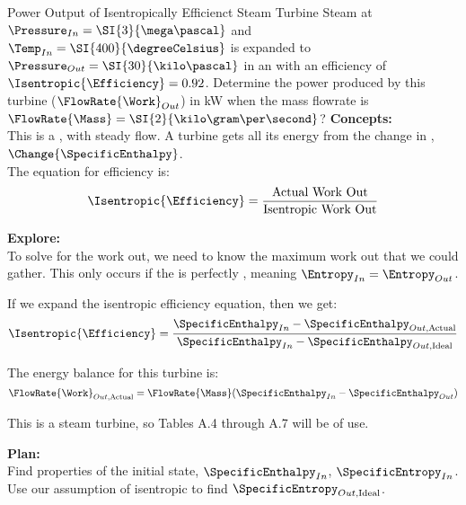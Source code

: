 \begin{example}{Power Output of Isentropically Efficienct Steam Turbine}
  Steam at $\Pressure_{In} = \SI{3}{\mega\pascal}$ and $\Temp_{In} = \SI{400}{\degreeCelsius}$ is expanded to $\Pressure_{Out} = \SI{30}{\kilo\pascal}$ in an   with an  efficiency of $\Isentropic{\Efficiency} = 0.92$.
  Determine the power produced by this turbine ($\FlowRate{\Work}_{Out}$) in \si{\kilo\watt} when the mass flowrate is $\FlowRate{\Mass} = \SI{2}{\kilo\gram\per\second}$?
  \tcblower{}
  \textbf{Concepts:} \\
  This is a , with  steady flow.
  A turbine gets all its energy from the change in , $\Change{\SpecificEnthalpy}$. \\
  The equation for  efficiency is:
  \begin{equation*}
    \Isentropic{\Efficiency} = \frac{\text{Actual Work Out}}{\text{Isentropic Work Out}}
  \end{equation*}

  \textbf{Explore:} \\
  To solve for the work out, we need to know the maximum work out that we could gather.
  This only occurs if the  is perfectly , meaning $\Entropy_{In} = \Entropy_{Out}$.

  If we expand the isentropic efficiency equation, then we get:
  \begin{equation*}
    \Isentropic{\Efficiency} = \frac{\SpecificEnthalpy_{In} - \SpecificEnthalpy_{Out, \text{Actual}}}{\SpecificEnthalpy_{In} - \SpecificEnthalpy_{Out, \text{Ideal}}}
  \end{equation*}

  The energy balance for this turbine is:
  \begin{equation*}
    \FlowRate{\Work}_{Out, \text{Actual}} = \FlowRate{\Mass} (\SpecificEnthalpy_{In} - \SpecificEnthalpy_{Out})
  \end{equation*}

  This is a steam turbine, so Tables A.4 through A.7 will be of use.

  \textbf{Plan:} \\
  Find properties of the initial state, $\SpecificEnthalpy_{In}$, $\SpecificEntropy_{In}$. \\
  Use our assumption of isentropic to find $\SpecificEntropy_{Out, \text{Ideal}}$.


\end{example}
